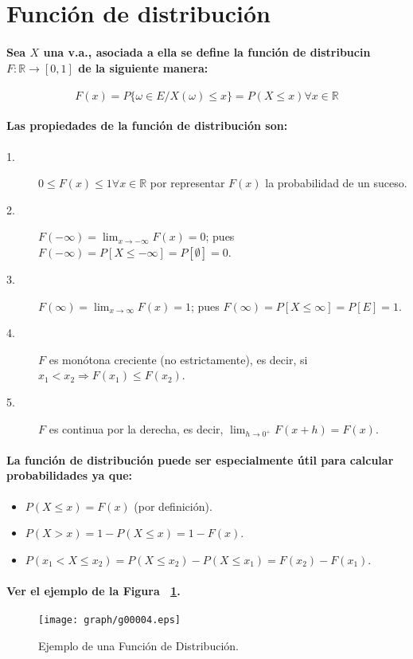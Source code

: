 \section{Función de distribución}
\paragraph{
Sea $X$ una v.a., asociada a ella se define la función de distribucin $F: \mathbb{R} \rightarrow [0,1] $ de la siguiente manera:
}
\begin{equation}
F(x) = P\{\omega \in E / X(\omega) \leq x\} =  P(X \leq x) \forall x \in \mathbb{R}
\end{equation}
\paragraph{
Las propiedades de la función de distribución son:
}
\begin{description}
\item[1.] $0 \leq F(x) \leq 1 \forall x \in \mathbb{R}$ por representar $F(x)$ la probabilidad de un suceso.
\item[2.] $F(-\infty)= \lim_{x\rightarrow - \infty}{F(x)} = 0$; pues $F(-\infty)=P[X \leq -\infty] = P[\emptyset] = 0$.
\item[3.] $F(\infty)= \lim_{x\rightarrow\infty}{F(x)} = 1$; pues $F(\infty)=P[X \leq \infty] = P[E] = 1$.
\item[4.] $F$ es monótona creciente (no estrictamente), es decir, si $x_{1} < x_{2} \Rightarrow F(x_{1}) \leq F(x_{2})$.
\item[5.] $F$ es continua por la derecha, es decir, $\lim_{h\rightarrow0^+}{F(x+h)}=F(x)$.
\end{description}
\paragraph{
La función de distribución puede ser especialmente útil para calcular probabilidades ya que:
}
\begin{itemize}
\item $P(X \leq x) = F(x)$ (por definición).
\item $P(X > x) = 1 - P(X \leq x) = 1 - F(x)$.
\item $P(x_1 < X \leq x_2) = P(X\leq x_2) - P(X\leq x_1) = F(x_2)-F(x_1)$.
\end{itemize}
\paragraph{
Ver el ejemplo de la Figura ~\ref{fig:FuncionDeDistribucion}.
}
\begin{figure}[ht]
\centering
\texttt{[image: graph/g00004.eps]}
\caption[Función de Distribución]{Ejemplo de una Función de Distribución.}
\label{fig:FuncionDeDistribucion}
\end{figure}

